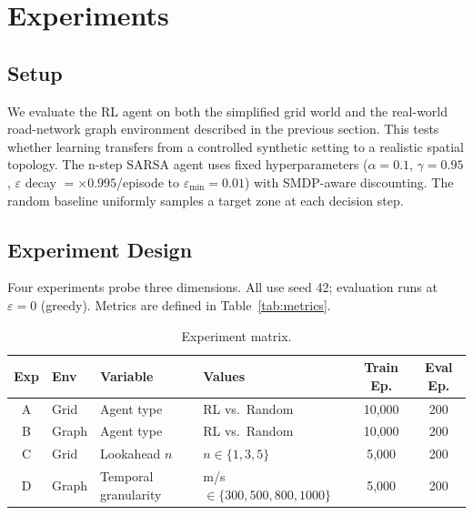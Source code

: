 
\section{Experiments}

\subsection{Setup}

We evaluate the RL agent on both the simplified grid world and the real-world road-network graph environment described in the previous section. This tests whether learning transfers from a controlled synthetic setting to a realistic spatial topology. The n-step SARSA agent uses fixed hyperparameters ($\alpha{=}0.1$, $\gamma{=}0.95$, $\varepsilon$ decay ${=}{\times}0.995$/episode to $\varepsilon_{\min}{=}0.01$) with SMDP-aware discounting. The random baseline uniformly samples a target zone at each decision step.

\subsection{Experiment Design}

Four experiments probe three dimensions. All use seed 42; evaluation runs at $\varepsilon{=}0$ (greedy). Metrics are defined in Table~\ref{tab:metrics}.

\begin{table}[ht]
\centering
\caption{Experiment matrix.}
\label{tab:exp-summary}
\begin{tabular}{clllcc}
\toprule
\textbf{Exp} & \textbf{Env} & \textbf{Variable} & \textbf{Values} & \textbf{Train Ep.} & \textbf{Eval Ep.} \\
\midrule
A & Grid  & Agent type          & RL vs.\ Random                        & 10,000 & 200 \\
B & Graph & Agent type          & RL vs.\ Random                        & 10,000 & 200 \\
C & Grid  & Lookahead $n$       & $n \in \{1, 3, 5\}$                  & 5,000  & 200 \\
D & Graph & Temporal granularity & m/s $\in \{300, 500, 800, 1000\}$     & 5,000  & 200 \\
\bottomrule
\end{tabular}
\end{table}

